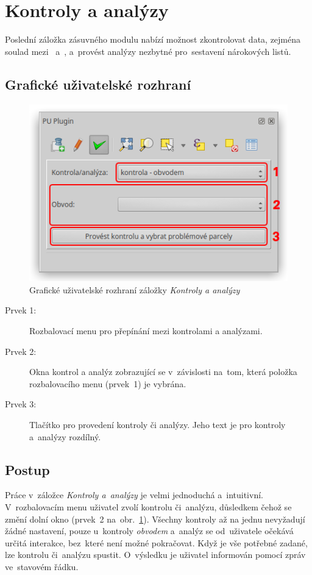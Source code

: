 \newpage

\section{Kontroly a analýzy}
\label{kontroly_analyzy}

Poslední záložka zásuvného modulu nabízí možnost zkontrolovat data, zejména soulad mezi~ a~, a~provést analýzy nezbytné pro~sestavení nárokových listů.

\subsection{Grafické uživatelské rozhraní}
\label{ca_gui}

	\begin{figure}[H]
		\centering
		\includegraphics[width=.55\textwidth]{./pictures/ca_gui.png}
		\caption[Grafické uživatelské rozhraní záložky \textit{Kontroly a analýzy}]{Grafické uživatelské rozhraní záložky \textit{Kontroly a analýzy}}
		\label{fig:ca_gui}
 	\end{figure}

\begin{description}
	\item[Prvek 1:] Rozbalovací menu pro přepínání mezi kontrolami a analýzami.
	\item[Prvek 2:] Okna kontrol a analýz zobrazující se v~závislosti na~tom, která položka rozbalovacího menu (prvek~1) je vybrána.
	\item[Prvek 3:] Tlačítko pro provedení kontroly či analýzy. Jeho text je pro kontroly a~analýzy rozdílný.
\end{description}

\subsection{Postup}
\label{postup_ca}

Práce v~záložce \textit{Kontroly a~analýzy} je velmi jednoduchá a~intuitivní. V~rozbalovacím menu uživatel zvolí kontrolu či~analýzu, důsledkem čehož se změní dolní okno (prvek~2 na~obr.~\ref{fig:ca_gui}). Všechny kontroly až na jednu nevyžadují žádné nastavení, pouze u~kontroly \textit{obvodem} a~analýz se od~uživatele očekává určitá interakce, bez~které není možné pokračovat. Když je vše potřebné zadané, lze kontrolu či~analýzu spustit. O~výsledku je uživatel informován pomocí zpráv ve~stavovém řádku.

